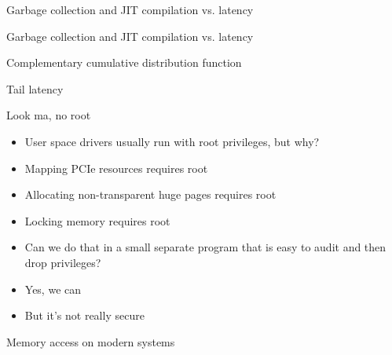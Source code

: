 \documentclass[NET,english,aspectratio=169,notitleframe]{tumbeamer}
\begin{document}
\begin{frame}{Garbage collection and JIT compilation vs. latency}
\centering
\end{frame}

\begin{frame}{Garbage collection and JIT compilation vs. latency}
\centering
\end{frame}

\begin{frame}{Complementary cumulative distribution function}
\centering
\end{frame}

\begin{frame}{Tail latency}
\centering
\end{frame}


\begin{frame}{Look ma, no root}
\begin{itemize}
\item User space drivers usually run with root privileges, but why?
\pause
\vspace{1em}
\item Mapping PCIe resources requires root
\item Allocating non-transparent huge pages requires root
\item Locking memory requires root
\vspace{1em}
\item Can we do that in a small separate program that is easy to audit and then drop privileges?
\pause
\item Yes, we can
\item But it's not really secure
\end{itemize}
\end{frame}

\begin{frame}{Memory access on modern systems}
\centering
\end{frame}
\end{document}
